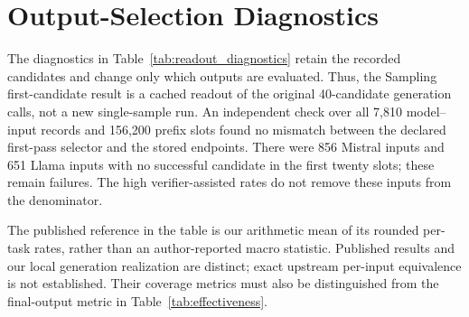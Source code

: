 \section{Output-Selection Diagnostics}
\label{app:readouts}
The diagnostics in Table~\ref{tab:readout_diagnostics} retain the recorded candidates and change only which outputs are evaluated. Thus, the Sampling first-candidate result is a cached readout of the original 40-candidate generation calls, not a new single-sample run. An independent check over all 7,810 model--input records and 156,200 prefix slots found no mismatch between the declared first-pass selector and the stored endpoints. There were 856 Mistral inputs and 651 Llama inputs with no successful candidate in the first twenty slots; these remain failures. The high verifier-assisted rates do not remove these inputs from the denominator.

The published \gellmo{} reference in the table is our arithmetic mean of its rounded per-task rates, rather than an author-reported macro statistic. Published results and our local generation realization are distinct; exact upstream per-input equivalence is not established. Their coverage metrics must also be distinguished from the final-output metric in Table~\ref{tab:effectiveness}.

